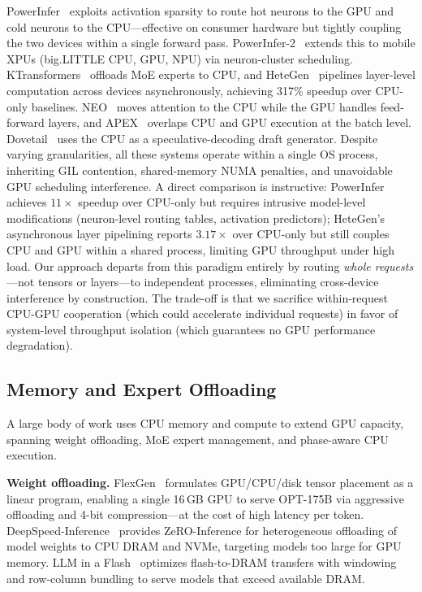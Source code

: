 \documentclass[10pt,conference]{IEEEtran}
\begin{document}
PowerInfer~\cite{song2024powerinfer} exploits activation sparsity to route hot neurons to the GPU and cold neurons to the CPU---effective on consumer hardware but tightly coupling the two devices within a single forward pass.
PowerInfer-2~\cite{xue2024powerinfer2} extends this to mobile XPUs (big.LITTLE CPU, GPU, NPU) via neuron-cluster scheduling.
KTransformers~\cite{chen2025ktransformers} offloads MoE experts to CPU, and HeteGen~\cite{zhao2024hetegen} pipelines layer-level computation across devices asynchronously, achieving 317\% speedup over CPU-only baselines.
NEO~\cite{neo2025} moves attention to the CPU while the GPU handles feed-forward layers, and APEX~\cite{apex2025} overlaps CPU and GPU execution at the batch level.
Dovetail~\cite{dovetail2024} uses the CPU as a speculative-decoding draft generator.
Despite varying granularities, all these systems operate within a single OS process, inheriting GIL contention, shared-memory NUMA penalties, and unavoidable GPU scheduling interference.
A direct comparison is instructive: PowerInfer achieves $11{\times}$ speedup over CPU-only but requires intrusive model-level modifications (neuron-level routing tables, activation predictors); HeteGen's asynchronous layer pipelining reports $3.17{\times}$ over CPU-only but still couples CPU and GPU within a shared process, limiting GPU throughput under high load.
Our approach departs from this paradigm entirely by routing \emph{whole requests}---not tensors or layers---to independent processes, eliminating cross-device interference by construction.
The trade-off is that we sacrifice within-request CPU-GPU cooperation (which could accelerate individual requests) in favor of system-level throughput isolation (which guarantees no GPU performance degradation).

\subsection{Memory and Expert Offloading}
A large body of work uses CPU memory and compute to extend GPU capacity, spanning weight offloading, MoE expert management, and phase-aware CPU execution.

\textbf{Weight offloading.}
FlexGen~\cite{sheng2023flexgen} formulates GPU/CPU/disk tensor placement as a linear program, enabling a single 16\,GB GPU to serve OPT-175B via aggressive offloading and 4-bit compression---at the cost of high latency per token.
DeepSpeed-Inference~\cite{aminabadi2022deepspeed} provides ZeRO-Inference for heterogeneous offloading of model weights to CPU DRAM and NVMe, targeting models too large for GPU memory.
LLM in a Flash~\cite{alizadeh2024flash} optimizes flash-to-DRAM transfers with windowing and row-column bundling to serve models that exceed available DRAM.
\end{document}
